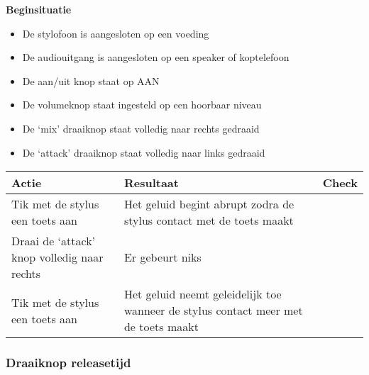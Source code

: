 \documentclass[12pt, a4paper, dutch]{article}
\newcommand{\cb}{\Square}
\newcommand{\stroom}{De stylofoon is aangesloten op een voeding}
\newcommand{\audio}{De audiouitgang is aangesloten op een speaker of koptelefoon}
\newcommand{\aan}{De aan/uit knop staat op AAN}
\newcommand{\vol}{De volumeknop staat ingesteld op een hoorbaar niveau}
\begin{document}
\begin{minipage}{\textwidth}
\textbf{Beginsituatie}
\begin{itemize}
	\item \stroom
	\item \audio
	\item \aan
	\item \vol
	\item De `mix' draaiknop staat volledig naar rechts gedraaid
	\item De `attack' draaiknop staat volledig naar links gedraaid
\end{itemize}

\medskip

\begin{tabularx}{\textwidth}{p{}p{}>{\raggedleft\arraybackslash}X}
\toprule
\textbf{Actie} & \textbf{Resultaat} & \textbf{Check}\\
\midrule
Tik met de stylus een toets aan &
Het geluid begint abrupt zodra de stylus contact met de toets maakt &
\cb\\

Draai de `attack' knop volledig naar rechts &
Er gebeurt niks &
\cb\\

Tik met de stylus een toets aan &
Het geluid neemt geleidelijk toe wanneer de stylus contact meer met de toets maakt &
\cb\\
\bottomrule
\end{tabularx}
\end{minipage}

\subsubsection{Draaiknop releasetijd}
\end{document}

